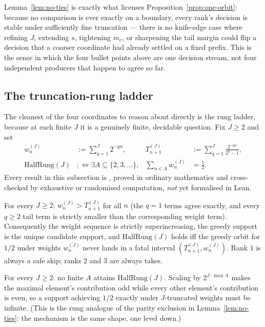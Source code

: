 \begin{rem}
Lemma~\ref{lem:no-ties} is exactly what licenses Proposition~\ref{prop:one-orbit}: because no
comparison is ever exactly on a boundary, every rank's decision is stable under sufficiently fine
truncation — there is no knife-edge case where refining $J$, extending $s$, tightening $m_c$, or
sharpening the tail margin could flip a decision that a coarser coordinate had already settled on a
fixed prefix. This is the sense in which the four bullet points above are one decision stream, not
four independent producers that happen to agree so far.
\end{rem}

\subsection*{The truncation-rung ladder}

The cleanest of the four coordinates to reason about directly is the rung ladder, because at each
finite $J$ it is a genuinely finite, decidable question. Fix $J\ge2$ and set
\[
\begin{aligned}
w_n^{(J)}&:=\sum_{q=1}^{J}2^{-qn}, &
T_{n+1}^{(J)}&:=\sum_{q=1}^{J}\frac{2^{-qn}}{2^q-1},\\
\mathrm{HalfRung}(J)&:\Longleftrightarrow
\exists A\subseteq\{2,3,\ldots\},&
\sum_{n\in A}w_n^{(J)}&=\tfrac12.
\end{aligned}
\]
Every result in this subsection is , proved in ordinary mathematics and cross-checked by
exhaustive or randomised computation, \emph{not} yet formalised in Lean.

\begin{lem}
\label{lem:tr-forced-greedy}
For every $J\ge2$: $w_n^{(J)}>T_{n+1}^{(J)}$ for all $n$ (the $q=1$ terms agree exactly, and every
$q\ge2$ tail term is strictly smaller than the corresponding weight term). Consequently the weight
sequence is strictly superincreasing, the greedy support is the unique candidate support, and
$\mathrm{HalfRung}(J)$ holds iff the greedy orbit for $1/2$ under weights $w_n^{(J)}$ never lands in
a fatal interval $(T_{n+1}^{(J)},w_n^{(J)})$. Rank $1$ is always a safe skip; ranks $2$ and $3$ are
always takes.
\end{lem}

\begin{lem}
\label{lem:tr-parity}
For every $J\ge2$: no finite $A$ attains $\mathrm{HalfRung}(J)$. Scaling by $2^{J\cdot\max A}$ makes
the maximal element's contribution odd while every other element's contribution is even, so a
support achieving $1/2$ exactly under $J$-truncated weights must be infinite. (This is the rung
analogue of the parity exclusion in Lemma~\ref{lem:no-ties}: the mechanism is the same shape, one
level down.)
\end{lem}

